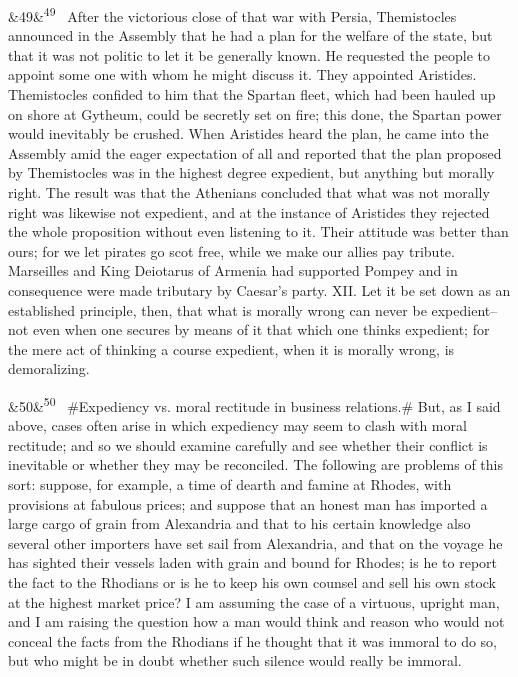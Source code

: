 \documentclass[12pt]{article}
\newcommand{\para}[1][]{\par\noindent\ifx&#1&\else\textsuperscript{\footnotesize #1}~\fi}
\begin{document}
\para[49] After the victorious close of that war with Persia, Themistocles announced in the Assembly that he had a plan for the welfare of the state, but that it was not politic to let it be generally known. He requested the people to appoint some one with whom he might discuss it. They appointed Aristides. Themistocles confided to him that the Spartan fleet, which had been hauled up on shore at Gytheum, could be secretly set on fire; this done, the Spartan power would inevitably be crushed. When Aristides heard the plan, he came into the Assembly amid the eager expectation of all and reported that the plan proposed by Themistocles was in the highest degree expedient, but anything but morally right. The result was that the Athenians concluded that what was not morally right was likewise not expedient, and at the instance of Aristides they rejected the whole proposition without even listening to it. Their attitude was better than ours; for we let pirates go scot free, while we make our allies pay tribute. Marseilles and King Deiotarus of Armenia had supported Pompey and in consequence were made tributary by Caesar's party. XII. Let it be set down as an established principle, then, that what is morally wrong can never be expedient--not even when one secures by means of it that which one thinks expedient; for the mere act of thinking a course expedient, when it is morally wrong, is demoralizing.

\para[50] \#Expediency vs. moral rectitude in business relations.\# But, as I said above, cases often arise in which expediency may seem to clash with moral rectitude; and so we should examine carefully and see whether their conflict is inevitable or whether they may be reconciled. The following are problems of this sort: suppose, for example, a time of dearth and famine at Rhodes, with provisions at fabulous prices; and suppose that an honest man has imported a large cargo of grain from Alexandria and that to his certain knowledge also several other importers have set sail from Alexandria, and that on the voyage he has sighted their vessels laden with grain and bound for Rhodes; is he to report the fact to the Rhodians or is he to keep his own counsel and sell his own stock at the highest market price? I am assuming the case of a virtuous, upright man, and I am raising the question how a man would think and reason who would not conceal the facts from the Rhodians if he thought that it was immoral to do so, but who might be in doubt whether such silence would really be immoral.
\end{document}
